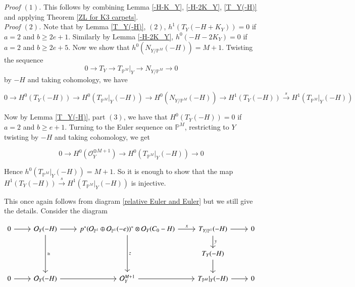 \documentclass[11pt,twoside]{amsart}
\theoremstyle{plain}
\numberwithin{equation}{section}
\theoremstyle{definition}
\begin{document}
\noindent\textit{Proof $(1)$.} This follows by combining Lemma \ref{-H-K_Y}, \ref{-H-2K_Y}, \ref{T_Y(-H)} and applying Theorem \ref{ZL for K3 carpets}. \\

\noindent\textit{Proof $(2)$.} Note that by Lemma \ref{T_Y(-H)}, $(2)$, $h^1(T_Y(-H+K_Y)) = 0$ if $a = 2$ and $b \geq 2e+1$. Similarly by Lemma \ref{-H-2K_Y}, $h^0(-H-2K_Y) = 0$ if $a = 2$ and $b \geq 2e+5$. Now we show that $h^0(N_{Y/\mathbb{P}^M}(-H)) = M+1$. Twisting the sequence $$0 \to T_Y \to T_{\mathbb{P}^M}|_Y \to N_{Y/\mathbb{P}^M} \to 0$$ by $-H$ and taking cohomology, we have 

\begin{equation}\label{35}
0 \to H^0(T_Y(-H)) \to H^0(T_{\mathbb{P}^M}|_Y(-H)) \to H^0(N_{Y/\mathbb{P}^M}(-H)) \to H^1(T_Y(-H)) \xrightarrow{s}  H^1(T_{\mathbb{P}^M}|_Y(-H))
\end{equation}

Now by Lemma \ref{T_Y(-H)}, part $(3)$, we have that $H^0(T_Y(-H)) = 0$ if $a = 2$ and $b \geq e+1$. Turning to the Euler sequence on $\mathbb{P}^M$, restricting to $Y$ twisting by $-H$ and taking cohomology, we get

\begin{equation}\label{36}
    0 \to H^0(\mathcal{O}_Y^{\oplus M+1}) \to H^0(T_{\mathbb{P}^M}|_Y(-H)) \to 0
\end{equation}

Hence $h^0(T_{\mathbb{P}^M}|_Y(-H)) = M+1$. So it is enough to show that the map $H^1(T_Y(-H)) \xrightarrow{s} H^1(T_{\mathbb{P}^M}|_Y(-H))$ is injective. \\

\color{black}

This once again follows from diagram \ref{relative Euler and Euler} but we still give the details. 
Consider the diagram 

\begin{equation}
\begin{tikzcd}\label{relative Euler and Euler 2}
  0 \arrow[r] & \mathcal{O}_Y(-H) \arrow[r] \arrow[dd, "\cong"] & p^*(\mathcal{O}_{\mathbb{P}^1} \oplus \mathcal{O}_{\mathbb{P}^1}(-e))^* \otimes \mathcal{O}_Y(C_0-H) \arrow[r, "x"] \arrow[dd, "z"] & T_{Y/\mathbb{P}^1}(-H) \arrow[r] \arrow[d, "y"] & 0 \\
  &&& T_Y(-H) \arrow[d] \\
   0 \arrow[r] & \mathcal{O}_Y(-H) \arrow[r] & \mathcal{O}_Y^{M+1} \arrow[r] & T_{\mathbb{P}^M}|_Y(-H) \arrow[r] & 0
\end{tikzcd}
\end{equation}
\end{document}
